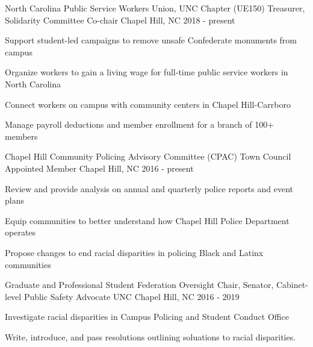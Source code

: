 
\begin{cventries}

  \cventry
    {North Carolina Public Service Workers Union, UNC Chapter (UE150)} %
    {Treasurer, Solidarity Committee Co-chair} %
    {Chapel Hill, NC} %
    {2018 - present} %
    {
      \begin{cvitems} %
        \item {Support student-led campaigns to remove unsafe Confederate monuments from campus}
        \item {Organize workers to gain a living wage for full-time public service workers in North Carolina}
        \item {Connect workers on campus with community centers in Chapel Hill-Carrboro}
        \item {Manage payroll deductions and member enrollment for a branch of 100+ members}
      \end{cvitems}
    }
	
  \cventry
    {Chapel Hill Community Policing Advisory Committee (CPAC)} %
    {Town Council Appointed Member} %
    {Chapel Hill, NC} %
    {2016 - present} %
    {
      \begin{cvitems} %
        \item {Review and provide analysis on annual and quarterly police reports and event plans}
        \item {Equip communities to better understand how Chapel Hill Police Department operates}
        \item {Propose changes to end racial disparities in policing Black and Latinx communities}
      \end{cvitems}
    }

  \cventry
    {Graduate and Professional Student Federation} %
    {Oversight Chair, Senator, Cabinet-level Public Safety Advocate} %
    {UNC Chapel Hill, NC} %
    {2016 - 2019} %
    {
      \begin{cvitems} %
        \item {Investigate racial disparities in Campus Policing and Student Conduct Office}
        \item {Write, introduce, and pass resolutions outlining soluations to racial disparities.}
      \end{cvitems}
    }
	

\end{cventries}
